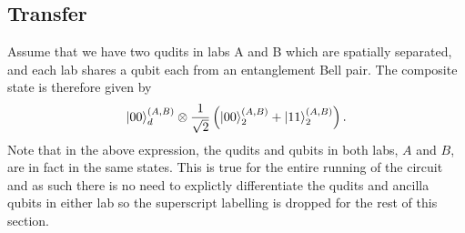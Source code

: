 \subsection{Transfer}
\label{subsection:aqctransfer}
Assume that we have two qudits in labs A and B which are spatially separated, and each lab shares a qubit each from an entanglement Bell pair. The composite state is therefore given by
\begin{equation}
    \ket{00}_d^{(A,B)}\otimes\frac{1}{\sqrt{2}}\left(\ket{00}^{(A,B)}_2 + \ket{11}^{(A,B)}_2\right).
\end{equation}
Note that in the above expression, the qudits and qubits in both labs, $A$ and $B$, are in fact in the same states.
This is true for the entire running of the circuit and as such there is no need to explictly differentiate the qudits and ancilla qubits in either lab so the superscript labelling is dropped for the rest of this section.\newline


